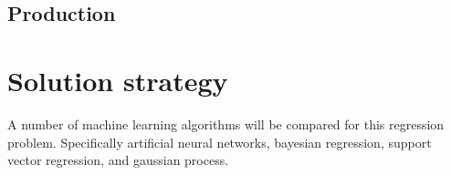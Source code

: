 \documentclass{scrartcl}
\begin{document}
\subsection{Production}


\section{Solution strategy}
A number of machine learning algorithms will be compared for this regression problem. Specifically artificial neural networks, bayesian regression, support vector regression, and gaussian process.


% 
\end{document}
